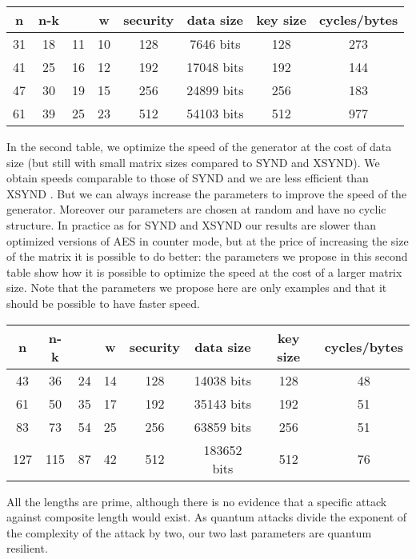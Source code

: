 \documentclass[11pt, a4paper]{llncs}
\begin{document}
\begin{center}

\begin{tabular}{|c|c|c|c|c|c|c|c|}
\hline
n & n-k &  & w & security & data size & key size & cycles/bytes\\
\hline
31 & 18 & 11 & 10 & 128 & 7646 bits & 128 & 273\\
\hline
41 & 25 & 16 & 12 & 192 & 17048 bits & 192 & 144\\
\hline
47 & 30 & 19 & 15 & 256 & 24899 bits& 256 & 183\\
\hline
61 & 39& 25 & 23 & 512 & 54103 bits&512 & 977\\
\hline
\end{tabular}\label{tab1}
\end{center}
In the second table, we optimize the speed of the generator at the cost of data size (but still with small
matrix sizes compared to SYND and XSYND). We obtain speeds comparable to those of SYND \cite{GLS07} and we are less efficient than XSYND \cite{MHC12}. But we can always increase the parameters to improve the speed of the generator. Moreover our parameters are chosen at random and have no cyclic structure. In practice as for SYND and XSYND our results are slower than optimized versions of AES in counter mode, but at the price of increasing the size of the matrix it is possible to do better: the parameters we
propose in this second table show how it is possible to optimize the speed at the cost of a larger matrix size.
Note that the parameters we propose here are only examples and that it should be possible to have faster speed.


\begin{center}
\begin{tabular}{|c|c|c|c|c|c|c|c|}
\hline
n & n-k &  & w & security & data size & key size & cycles/bytes\\
\hline
43 & 36 & 24& 14& 128 & 14038 bits& 128 &48\\
\hline
61 & 50 &35 &17 &192 &35143 bits&192 &51\\
\hline
83 & 73 & 54 &25 &256 &63859 bits& 256 &51 \\
\hline
127 &115 & 87 &42 &512 &183652 bits&512 &76\\
\hline
\end{tabular}\label{tab2}

\end{center}

All the lengths  are prime, although there is no evidence that a specific attack against composite length would exist. As quantum attacks divide the exponent of the complexity of the attack by two, our two last parameters are quantum resilient.
\end{document}
